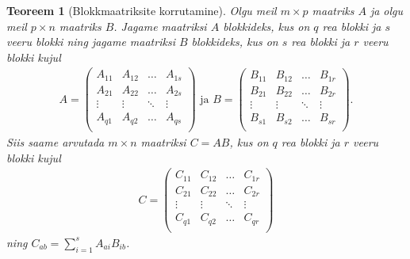 \documentclass[a4paper,12pt]{article}
\theoremstyle{plain}
\newtheorem{teoreem}{Teoreem}[section]
\theoremstyle{definition}
\numberwithin{equation}{section}
\begin{document}
\begin{teoreem}[Blokkmaatriksite korrutamine]
Olgu meil $m \times p$ maatriks $A$ ja olgu meil $p \times n$ maatriks $B$. Jagame maatriksi $A$ blokkideks, kus on $q$ rea blokki ja $s$ veeru blokki ning jagame maatriksi $B$ blokkideks, kus on $s$ rea blokki ja $r$ veeru blokki kujul
\begin{align*}
A = \begin{pmatrix}
A_{11} & A_{12} & \dots & A_{1s} \\
A_{21} & A_{22} & \dots & A_{2s} \\
\vdots & \vdots & \ddots & \vdots \\
A_{q1} & A_{q2} & \dots & A_{qs} \\
\end{pmatrix} \text{ ja }
B = \begin{pmatrix}
B_{11} & B_{12} & \dots & B_{1r} \\
B_{21} & B_{22} & \dots & B_{2r} \\
\vdots & \vdots & \ddots & \vdots \\
B_{s1} & B_{s2} & \dots & B_{sr} \\
\end{pmatrix}.
\end{align*}
Siis saame arvutada $m \times n$ maatriksi $C = AB$, kus on $q$ rea blokki ja $r$ veeru blokki kujul
\begin{align*}
C = \begin{pmatrix}
C_{11} & C_{12} & \dots & C_{1r} \\
C_{21} & C_{22} & \dots & C_{2r} \\
\vdots & \vdots & \ddots & \vdots \\
C_{q1} & C_{q2} & \dots & C_{qr} \\
\end{pmatrix}
\end{align*}
ning $C_{ab} = \sum_{i = 1}^{s} A_{ai} B_{ib}$.
\end{teoreem}
\end{document}

